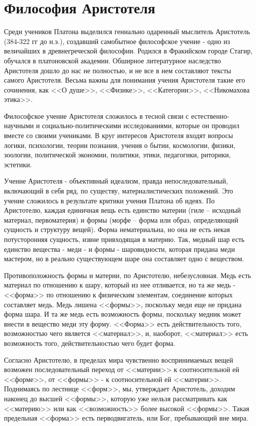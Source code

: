 \documentclass[12pt,a4paper]{article}
\begin{document}
	\section{Философия Аристотеля~\checkmark}
	Среди учеников Платона выделился гениально одаренный мыслитель Аристотель (384-322 гг до н.э.), создавший самобытное философское учение - одно из величайших в древнегреческой философии. Родился в Фракийском городе Стагир, обучался в платоновской академии. Обширное литературное наследство Аристотеля дошло до нас не полностью, и не все в нем составляют тексты самого Аристотеля. Весьма важны для понимания учения Аристотеля такие его сочинения, как <<О душе>>, <<Физике>>, <<Категории>>, <<Никомахова этика>>. 
	\par Философское учение Аристотеля сложилось в тесной связи с естественно-научными и социально-политическими исследованиями, которые он проводил вместе со своими учениками. В круг интересов Аристотеля входят вопросы логики, психологии, теории познания, учения о бытии, космологии, физики, зоологии, политической экономии, политики, этики, педагогики, риторики, эстетики. 
	\par Учение Аристотеля - объективный идеализм, правда непоследовательный, включающий в себя ряд, по существу, материалистических положений. Это учение сложилось в результате критики учения Платона об идеях. По Аристотелю, каждая единичная вещь есть единство материи (гиле -- исходный материал, первоматерия) и формы (морфе -- форма или образ, определяющий сущность и структуру вещей). Форма нематериальна, но она не есть некая потусторонняя сущность, извне привходящая в материю. Так, медный шар есть единство вещества - меди - и формы - шаровидности, которая придана меди мастером, но в реально существующем шаре она составляет одно с веществом. 
	\par Противоположность формы и материи, по Аристотелю, небезусловная. Медь есть материал по отношению к шару, который из нее отливается, но та же медь - <<форма>> по отношению к физическим элементам, соединение которых составляет медь. Медь лишена <<формы>>, поскольку меди еще не придана форма шара. И та же медь есть возможность формы, поскольку медник может внести в вещество меди эту форму. <<Форма>> есть действительность того, возможностью чего является <<материал>>, и, наоборот, <<материал>> есть возможность того, действительностью чего будет форма. 
	\par Согласно Аристотелю, в пределах мира чувственно воспринимаемых вещей возможен последовательный переход от <<материи>> к соотносительной ей <<форме>>, от <<формы>> - к соотносительной ей <<материи>>. Поднимаясь по лестнице <<форм>>, мы, утверждает Аристотель, доходим наконец до высшей <<формы>>, которую уже нельзя рассматривать как <<материю>> или как <<возможность>> более высокой <<формы>>. Такая предельная <<форма>> есть перводвигатель, или Бог, пребывающий вне мира. 
\end{document}

